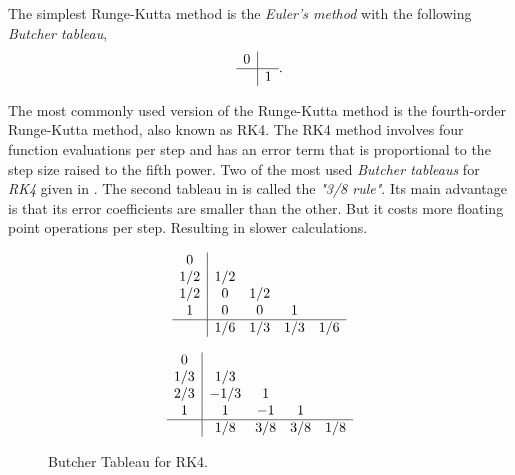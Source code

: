 \documentclass[a4paper,oneside,12pt]{report}
\numberwithin{equation}{chapter}
\begin{document}
The simplest Runge-Kutta method is the \textit{Euler's method} with the following \textit{Butcher tableau},
\[ 
    \begin{array} 
        {c|cccc}
        0\\
        \hline
        & 1
    \end{array} .
\] 

The most commonly used version of the Runge-Kutta method is the fourth-order Runge-Kutta method, also known as RK4. 
The RK4 method involves four function evaluations per step and has an error term that is proportional to the step size raised to the fifth power.
Two of the most used \textit{Butcher tableaus} for \textit{RK4} given in .
The second tableau in  is called the \textit{"3/8 rule"}. Its main advantage is that its error coefficients are smaller than the other. But it costs more floating point operations per step. 
Resulting in slower calculations. 

\begin{figure}[h!]
    \centering
    \begin{minipage}{.5\textwidth}
        \[ 
        \begin{array} 
            {c|cccc}
            0\\
            1/2 & 1/2 \\
            1/2 & 0 & 1/2 \\
            1   & 0 & 0 & 1\\
            \hline
            & 1/6 & 1/3 & 1/3 & 1/6
        \end{array}
        \]  
    \end{minipage}%
    \begin{minipage}{.5\textwidth}
        \[ 
        \begin{array} 
            {c|cccc}
            0\\
            1/3 & 1/3 \\
            2/3 & -1/3 & 1 \\
            1   & 1 & -1 & 1\\
            \hline
            & 1/8 & 3/8 & 3/8 & 1/8
        \end{array}
        \]  
    \end{minipage}
    \vspace{20pt}
    \caption{Butcher Tableau for RK4.}
    \label{fig:Butcher-RK4}
\end{figure}



\newpage
\end{document}
